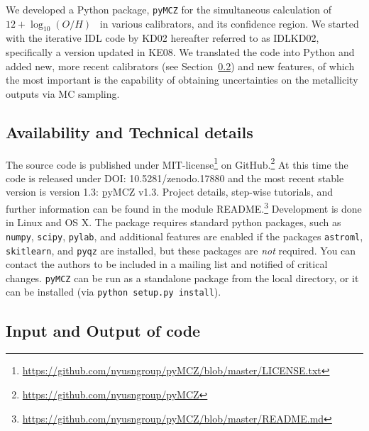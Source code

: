 \documentclass{emulateapj} \usepackage{amsmath} \usepackage{float}
\newcommand{\oxabinline}{\ensuremath{12 + \log_{10}(O/H)}}
\begin{document}
We developed a Python package, \verb=pyMCZ= for the simultaneous
calculation of \oxabinline~ in various calibrators, and its confidence
region. 
We started with the iterative IDL code by KD02
hereafter referred to as IDLKD02, specifically a version updated in
KE08. %
We translated
  the code into Python and added new, more recent calibrators (see
  Section~\ref{sec:IO}) and new features, of which the most important
  is the capability of obtaining uncertainties on the metallicity
  outputs via MC sampling.



\subsection{Availability and Technical details}
The source code is published under
MIT-license\footnote{\url{https://github.com/nyusngroup/pyMCZ/blob/master/LICENSE.txt}}
on GitHub.\footnote{\url{https://github.com/nyusngroup/pyMCZ}} At this
time the code is released under DOI: 10.5281/zenodo.17880 and the most recent stable version is version
1.3: {\b pyMCZ v1.3}. Project details, step-wise tutorials, and
further information can be found in the module
README.\footnote{\url{https://github.com/nyusngroup/pyMCZ/blob/master/README.md}}
Development is done in Linux and OS X. The package requires standard
python packages, such as \verb=numpy=, \verb=scipy=, \verb=pylab=, and
additional features are enabled if the packages \verb=astroml=,
\verb=skitlearn=, and \verb=pyqz= are installed, but these packages
are \emph{not} required. You can contact the authors to be included in a
mailing list and notified of critical changes.
\verb=pyMCZ= can be run as a standalone package from the local directory, or it can be installed (via \verb=python setup.py install=).


\subsection{Input and Output of code}\label{sec:IO}
\end{document}
